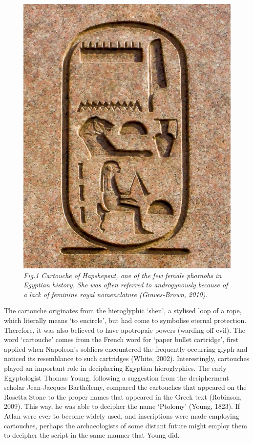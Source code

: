 \begin{figure}
\includegraphics[scale=0.1]{./Images/Cartouche.jpeg}
	{\footnotesize \it Fig.1 Cartouche of Hapshepsut, one of the few female pharaohs in Egyptian history. She was often referred to androgynously because of a lack of feminine royal nomenclature (Graves-Brown, 2010). }

\end{figure}
 

The cartouche originates from the hieroglyphic ‘shen’, a stylised loop of a rope, which literally means ‘to encircle’, but had come to symbolise eternal protection. Therefore, it was also believed to have apotropaic powers (warding off evil). The word ‘cartouche’ comes from the French word for ‘paper bullet cartridge’, first applied when Napoleon’s soldiers encountered the frequently occurring glyph and noticed its resemblance to such cartridges (White, 2002). Interestingly, cartouches played an important role in deciphering Egyptian hieroglyphics. The early Egyptologist Thomas Young, following a suggestion from the decipherment scholar Jean-Jacques Barthélemy, compared the cartouches that appeared on the Rosetta Stone to the proper names that appeared in the Greek text (Robinson, 2009). This way, he was able to decipher the name ‘Ptolomy’ (Young, 1823). If Atlan were ever to become widely used, and inscriptions were made employing cartouches, perhaps the archaeologists of some distant future might employ them to decipher the script in the same manner that Young did. 

